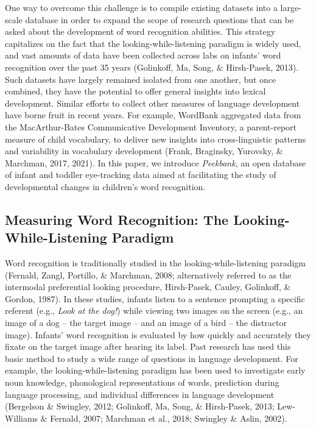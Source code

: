 \documentclass[
  english,
  man,floatsintext]{apa6}
\begin{document}
One way to overcome this challenge is to compile existing datasets into a large-scale database in order to expand the scope of research questions that can be asked about the development of word recognition abilities.
This strategy capitalizes on the fact that the looking-while-listening paradigm is widely used, and vast amounts of data have been collected across labs on infants' word recognition over the past 35 years (Golinkoff, Ma, Song, \& Hirsh-Pasek, 2013).
Such datasets have largely remained isolated from one another, but once combined, they have the potential to offer general insights into lexical development.
Similar efforts to collect other measures of language development have borne fruit in recent years.
For example, WordBank aggregated data from the MacArthur-Bates Communicative Development Inventory, a parent-report measure of child vocabulary, to deliver new insights into cross-linguistic patterns and variability in vocabulary development (Frank, Braginsky, Yurovsky, \& Marchman, 2017, 2021).
In this paper, we introduce \emph{Peekbank}, an open database of infant and toddler eye-tracking data aimed at facilitating the study of developmental changes in children's word recognition.

\hypertarget{measuring-word-recognition-the-looking-while-listening-paradigm}{%
\subsection{Measuring Word Recognition: The Looking-While-Listening Paradigm}\label{measuring-word-recognition-the-looking-while-listening-paradigm}}

Word recognition is traditionally studied in the looking-while-listening paradigm (Fernald, Zangl, Portillo, \& Marchman, 2008; alternatively referred to as the intermodal preferential looking procedure, Hirsh-Pasek, Cauley, Golinkoff, \& Gordon, 1987).
In these studies, infants listen to a sentence prompting a specific referent (e.g., \emph{Look at the dog!}) while viewing two images on the screen (e.g., an image of a dog -- the target image -- and an image of a bird -- the distractor image).
Infants' word recognition is evaluated by how quickly and accurately they fixate on the target image after hearing its label.
Past research has used this basic method to study a wide range of questions in language development.
For example, the looking-while-listening paradigm has been used to investigate early noun knowledge, phonological representations of words, prediction during language processing, and individual differences in language development (Bergelson \& Swingley, 2012; Golinkoff, Ma, Song, \& Hirsh-Pasek, 2013; Lew-Williams \& Fernald, 2007; Marchman et al., 2018; Swingley \& Aslin, 2002).
\end{document}
